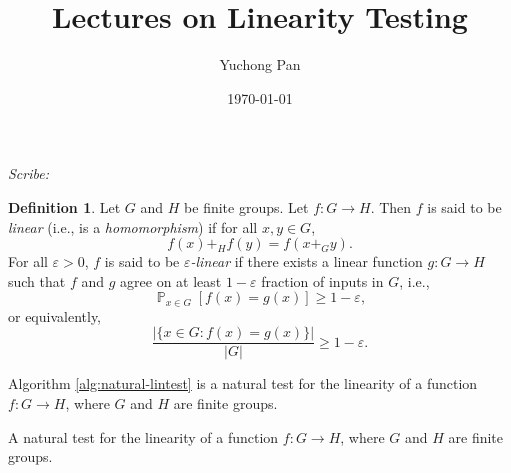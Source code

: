 \documentclass[letterpaper, reqno,11pt]{article}
\newcommand{\PP}{\mathop{{}\mathbb{P}}}
\begin{document}
\title{Lectures on Linearity Testing}
\author{Yuchong Pan}
\date{\today}
\newtheorem{theorem}{Theorem}
\newtheorem{lemma}[theorem]{Lemma}
\newtheorem{proposition}[theorem]{Proposition}
\newtheorem{corollary}[theorem]{Corollary}
\newtheorem{fact}[theorem]{Fact}
\newtheorem{problem}[theorem]{Problem}
\newtheorem{claim}{Claim}
\newtheorem{exercise}{Exercise}
\theoremstyle{definition}
\newtheorem{definition}[theorem]{Definition}
%

\begin{framed}
 \hfill \thedate
\begin{center}
\Large{\thetitle}
\end{center}
 \hfill {\em Scribe: \theauthor}
\end{framed}

\begin{definition}
  Let $G$ and $H$ be finite groups. Let $f : G \to H$. Then $f$ is said to be \emph{linear} (i.e., is a \emph{homomorphism}) if for all $x, y \in G$,
  $$ f(x) +_H f(y) = f\left(x +_G y\right). $$
  For all $\varepsilon > 0$, $f$ is said to be \emph{$\varepsilon$-linear} if there exists a linear function $g : G \to H$ such that $f$ and $g$ agree on at least $1 - \varepsilon$ fraction of inputs in $G$, i.e.,
  $$ \PP_{x \in G}[f(x) = g(x)] \geq 1 - \varepsilon, $$
  or equivalently,
  $$ \frac{|\{ x \in G : f(x) = g(x) \}|}{|G|} \geq 1 - \varepsilon. $$
\end{definition}

Algorithm \ref{alg:natural-lintest} is a natural test for the linearity of a function $f : G \to H$, where $G$ and $H$ are finite groups.

\begin{algorithm}
  \caption{A natural test for the linearity of a function $f : G \to H$, where $G$ and $H$ are finite groups.}
  \label{alg:natural-lintest}
\end{algorithm}
\end{document}
